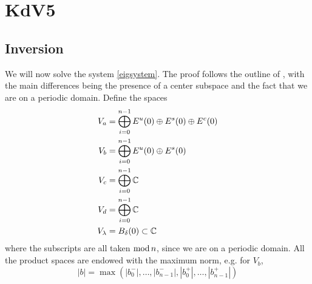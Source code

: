 \documentclass[thesis.tex]{subfiles}
\begin{document}
\iffulldocument\else
	\chapter{KdV5}
\fi

\section{Inversion}

We will now solve the system \cref{eigsystem}. The proof follows the outline of \cite[Theorem 2]{Sandstede1998}, with the main differences being the presence of a center subspace and the fact that we are on a periodic domain. Define the spaces
\begin{align*}
V_a &= \bigoplus_{i=0}^{n-1} E^u(0) \oplus E^s(0) \oplus E^c(0) \\
V_b &= \bigoplus_{i=0}^{n-1} E^u(0) \oplus E^s(0) \\
V_c &= \bigoplus_{i=0}^{n-1} \mathbb{C} \\
V_d &= \bigoplus_{i=0}^{n-1} \mathbb{C} \\
V_\lambda &= B_\delta(0) \subset \mathbb{C}
\end{align*}
where the subscripts are all taken $\mathop\mathrm{mod}\nolimits n$, since we are on a periodic domain. All the product spaces are endowed with the maximum norm, e.g. for $V_b$, 
\[
|b| = \max(|b_0^-|, \dots, |b_{n-1}^-|, |b_0^+|, \dots, |b_{n-1}^+|)
\]
\end{document}
